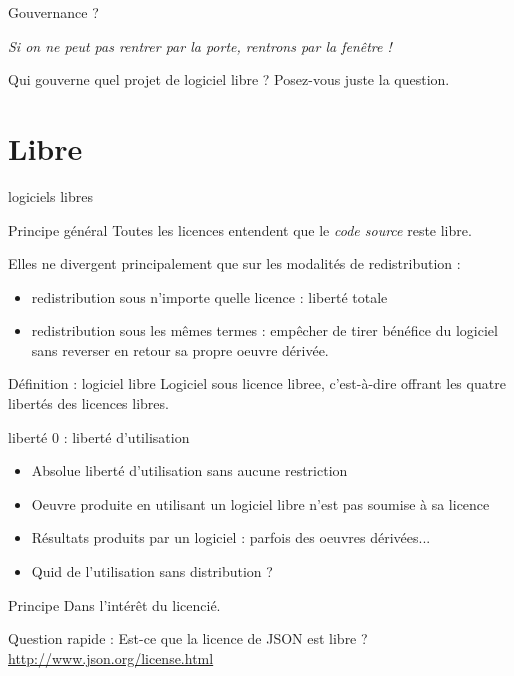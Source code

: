 \documentclass{beamer}
\begin{document}
\begin{frame}{Gouvernance ?}
  
\textit{Si on ne peut pas rentrer par la porte, rentrons par la fenêtre !}

Qui gouverne quel projet de logiciel libre ? Posez-vous juste la question.

\end{frame}



\section{Libre}

\begin{frame}{logiciels libres}

  \begin{alertblock}{Principe général}
    Toutes les licences entendent que le \textit{code source} reste libre.
  \end{alertblock}
  Elles ne divergent principalement que sur les modalités de redistribution :
  \begin{itemize}
  \item redistribution sous n'importe quelle licence : liberté totale
  \item redistribution sous les mêmes termes : empêcher de tirer bénéfice du logiciel sans reverser en retour sa propre oeuvre dérivée.
  \end{itemize}

  \begin{alertblock}{Définition : logiciel libre}
    Logiciel sous licence libree, c'est-à-dire offrant les quatre libertés des licences libres.    
  \end{alertblock}
  
\end{frame}



\begin{frame}{liberté 0 : liberté d'utilisation}
  \begin{itemize}
  \item Absolue liberté d'utilisation sans aucune restriction
  \item Oeuvre produite en utilisant un logiciel libre n'est pas soumise à sa licence
  \item Résultats produits par un logiciel : parfois des oeuvres dérivées...
  \item Quid de l'utilisation sans distribution ?
  \end{itemize}

  \begin{alertblock}{Principe}
    Dans l'intérêt du licencié.
  \end{alertblock}
  
  Question rapide : Est-ce que la licence de JSON est libre ? \url{http://www.json.org/license.html}

\end{frame}
\end{document}
